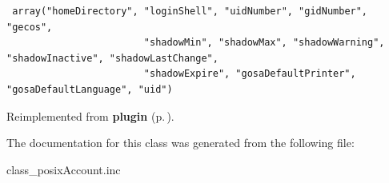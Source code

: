 \footnotesize\begin{verbatim} array("homeDirectory", "loginShell", "uidNumber", "gidNumber", "gecos",
                        "shadowMin", "shadowMax", "shadowWarning", "shadowInactive", "shadowLastChange",
                        "shadowExpire", "gosaDefaultPrinter", "gosaDefaultLanguage", "uid")
\end{verbatim}\normalsize 


Reimplemented from {\bf plugin} {\rm (p.\,\pageref{classplugin})}.

The documentation for this class was generated from the following file:\begin{CompactItemize}
\item 
class\_\-posix\-Account.inc\end{CompactItemize}
